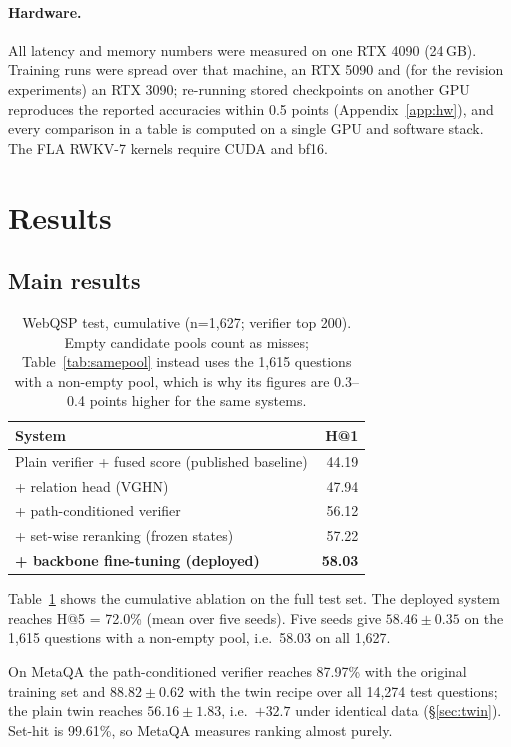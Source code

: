 \documentclass[sigconf,review,anonymous]{acmart}
\begin{document}
\paragraph{Hardware.}
All latency and memory numbers were measured on one RTX 4090 (24\,GB). Training runs were spread over that machine, an RTX 5090 and (for the revision experiments) an RTX 3090; re-running stored checkpoints on another GPU reproduces the reported accuracies within 0.5 points (Appendix~\ref{app:hw}), and every comparison in a table is computed on a single GPU and software stack. The FLA RWKV-7 kernels require CUDA and bf16.

\section{Results}
\label{sec:results}

\subsection{Main results}
\label{sec:main}

\begin{table}[t]
\centering\small
\caption{WebQSP test, cumulative (n=1,627; verifier top 200). Empty candidate pools count as misses; Table~\ref{tab:samepool} instead uses the 1,615 questions with a non-empty pool, which is why its figures are 0.3--0.4 points higher for the same systems.}
\label{tab:main}
\begin{tabular}{lr}
\toprule
System & H@1 \\
\midrule
Plain verifier + fused score (published baseline) & 44.19 \\
\quad + relation head (VGHN) & 47.94 \\
\quad + path-conditioned verifier & 56.12 \\
\quad + set-wise reranking (frozen states) & 57.22 \\
\quad \textbf{+ backbone fine-tuning (deployed)} & \textbf{58.03} \\
\bottomrule
\end{tabular}
\end{table}

Table~\ref{tab:main} shows the cumulative ablation on the full test set. The deployed system reaches H@5 = 72.0\% (mean over five seeds). Five seeds give $58.46\pm0.35$ on the 1,615 questions with a non-empty pool, i.e.\ 58.03 on all 1,627.

On MetaQA the path-conditioned verifier reaches 87.97\% with the original training set and $88.82\pm0.62$ with the twin recipe over all 14,274 test questions; the plain twin reaches $56.16\pm1.83$, i.e.\ $+32.7$ under identical data (\S\ref{sec:twin}). Set-hit is 99.61\%, so MetaQA measures ranking almost purely.
\end{document}
